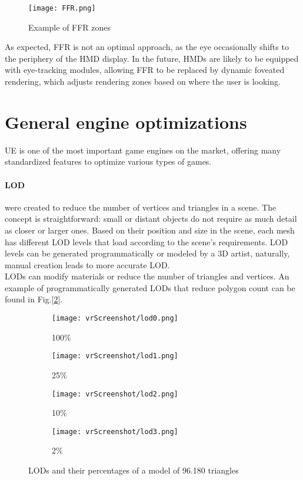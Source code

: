 \begin{figure}[ht]
  \centering
  \texttt{[image: FFR.png]}
  \caption{Example of FFR zones}
  \label{fig:FFR}
\end{figure}

\noindent
As expected, \ac{FFR} is not an optimal approach, as the eye occasionally shifts to the periphery of the \ac{HMD} display.
In the future, \ac{HMD}s are likely to be equipped with eye-tracking modules, allowing \ac{FFR} to be replaced by dynamic foveated rendering, which adjusts rendering zones based on where the user is looking.

\section{General engine optimizations}
\noindent
\ac{UE} is one of the most important game engines on the market, offering many standardized features to optimize various types of games.

\paragraph{\ac{LOD}}
were created to reduce the number of vertices and triangles in a scene.
The concept is straightforward: small or distant objects do not require as much detail as closer or larger ones. 
Based on their position and size in the scene, each mesh has different \ac{LOD} levels that load according to the scene's requirements.
\ac{LOD} levels can be generated programmatically or modeled by a 3D artist, naturally, manual creation leads to more accurate \ac{LOD}.\\
\ac{LOD}s can modify materials or reduce the number of triangles and vertices. An example of programmatically generated \ac{LOD}s that reduce polygon count can be found in Fig.[\ref{fig:lods}].

\captionsetup[subfigure]{labelformat=empty}
\begin{figure}[h]
  \centering
  \begin{subfigure}{0.24\textwidth}
      \texttt{[image: vrScreenshot/lod0.png]}
      \caption{100\%}
  \end{subfigure}
  \begin{subfigure}{0.24\textwidth}
      \texttt{[image: vrScreenshot/lod1.png]}
      \caption{25\%}
  \end{subfigure}
  \begin{subfigure}{0.24\textwidth}
      \texttt{[image: vrScreenshot/lod2.png]}
      \caption{10\%}
  \end{subfigure}
  \begin{subfigure}{0.24\textwidth}
      \texttt{[image: vrScreenshot/lod3.png]}
      \caption{2\%}
  \end{subfigure}
  \caption{LODs and their percentages of a model of 96.180 triangles}
  \label{fig:lods}
\end{figure}

